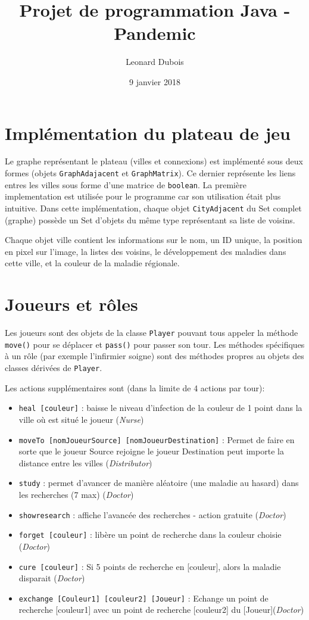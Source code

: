 \documentclass[10pt,a4paper]{article}
\title{Projet de programmation Java - Pandemic}
\author{Leonard Dubois }
\date{9 janvier 2018}
\begin{document}
	\maketitle
	
	\section*{Implémentation du plateau de jeu}
	Le graphe représentant le plateau (villes et connexions) est implémenté sous deux formes (objets \texttt{GraphAdajacent} et \texttt{GraphMatrix}). Ce dernier représente les liens entres les villes sous forme d'une matrice de \texttt{boolean}. La première implementation est utilisée pour le programme car son utilisation était plus intuitive. Dans cette implémentation, chaque objet \texttt{CityAdjacent} du Set complet (graphe) possède un Set d'objets du même type représentant sa liste de voisins.
	
	Chaque objet ville contient les informations sur le nom, un ID unique, la position en pixel sur l'image, la listes des voisins, le développement des maladies dans cette ville, et la couleur de la maladie régionale.
	
	
	\section*{Joueurs et rôles}
	Les joueurs sont des objets de la classe \texttt{Player} pouvant tous appeler la méthode \texttt{move()} pour se déplacer et \texttt{pass()} pour passer son tour. Les méthodes spécifiques à un rôle (par exemple l'infirmier soigne) sont des méthodes propres au objets des classes dérivées de \texttt{Player}.
	
	Les actions supplémentaires sont (dans la limite de 4 actions par tour):
	\begin{itemize}
	\item \texttt{heal [couleur]} : baisse le niveau d'infection de la couleur de 1 point dans la ville où est situé le joueur (\emph{Nurse})
	
	\item \texttt{moveTo [nomJoueurSource] [nomJoueurDestination]} : Permet de faire en sorte que le joueur Source rejoigne le joueur Destination peut importe la distance entre les villes (\emph{Distributor})
	
	\item \texttt{study} : permet d'avancer de manière aléatoire (une maladie au hasard) dans les recherches (7 max) (\emph{Doctor})
	\item \texttt{showresearch} : affiche l'avancée des recherches - action gratuite (\emph{Doctor})
	\item \texttt{forget [couleur]} : libère un point de recherche dans la couleur choisie (\emph{Doctor})
	\item \texttt{cure [couleur]} : Si 5 points de recherche en [couleur], alors la maladie disparait (\emph{Doctor})
	\item \texttt{exchange [Couleur1] [couleur2] [Joueur]} : Echange un point de recherche [couleur1] avec un point de recherche [couleur2] du [Joueur](\emph{Doctor})
	\end{itemize}
\end{document}
